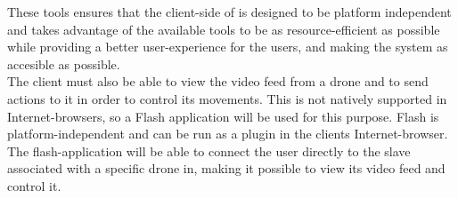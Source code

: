 These tools ensures that the client-side of \projectname{} is designed to be platform independent and takes advantage of the available tools to be as resource-efficient as possible while providing a better user-experience for the users, and making the system as accesible as possible. \\

The client must also be able to view the video feed from a drone and to send actions to it in order to control its movements. 
This is not natively supported in Internet-browsers, so a Flash application will be used for this purpose. 
Flash is platform-independent and can be run as a plugin in the clients Internet-browser.
The flash-application will be able to connect the user directly to the slave associated with a specific drone in, making it possible to view its video feed and control it.

